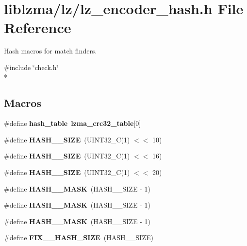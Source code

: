 \section{liblzma/lz/lz\-\_\-encoder\-\_\-hash.h File Reference}
\label{lz__encoder__hash_8h}


Hash macros for match finders.  


{\ttfamily \#include \char`\"{}check.\-h\char`\"{}}\\*
\subsection*{Macros}
\begin{DoxyCompactItemize}
\item 
\#define {\bfseries hash\-\_\-table}~{\bf lzma\-\_\-crc32\-\_\-table}[0]\label{lz__encoder__hash_8h_a2376b5aab98fe359d071d7e48d0e942d}

\item 
\#define {\bfseries H\-A\-S\-H\-\_\-\_\-\-S\-I\-Z\-E}~(U\-I\-N\-T32\-\_\-\-C(1) $<$$<$ 10)\label{lz__encoder__hash_8h_a47e9576ccf51512a660a2b5e1af33c09}

\item 
\#define {\bfseries H\-A\-S\-H\-\_\-\_\-\-S\-I\-Z\-E}~(U\-I\-N\-T32\-\_\-\-C(1) $<$$<$ 16)\label{lz__encoder__hash_8h_af082dc83659e29389678a357b4210b72}

\item 
\#define {\bfseries H\-A\-S\-H\-\_\-\_\-\-S\-I\-Z\-E}~(U\-I\-N\-T32\-\_\-\-C(1) $<$$<$ 20)\label{lz__encoder__hash_8h_a3b018ce8da57d501b6375a80312f4705}

\item 
\#define {\bfseries H\-A\-S\-H\-\_\-\_\-\-M\-A\-S\-K}~(H\-A\-S\-H\-\_\-\_\-\-S\-I\-Z\-E -\/ 1)\label{lz__encoder__hash_8h_a53e9aa7ea2ae54690f8d354c3ed17e62}

\item 
\#define {\bfseries H\-A\-S\-H\-\_\-\_\-\-M\-A\-S\-K}~(H\-A\-S\-H\-\_\-\_\-\-S\-I\-Z\-E -\/ 1)\label{lz__encoder__hash_8h_aeb4a855156405dca899ad209a7633dae}

\item 
\#define {\bfseries H\-A\-S\-H\-\_\-\_\-\-M\-A\-S\-K}~(H\-A\-S\-H\-\_\-\_\-\-S\-I\-Z\-E -\/ 1)\label{lz__encoder__hash_8h_ae45735bb29fcec47c5bb078a68640931}

\item 
\#define {\bfseries F\-I\-X\-\_\-\_\-\-H\-A\-S\-H\-\_\-\-S\-I\-Z\-E}~(H\-A\-S\-H\-\_\-\_\-\-S\-I\-Z\-E)\label{lz__encoder__hash_8h_a5b1c35c794abd8e8f500bb6acc4f091f}


\end{DoxyCompactItemize}
